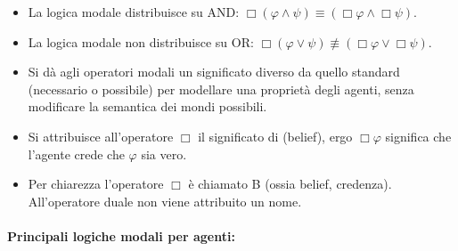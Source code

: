 \begin{itemize}
  \item La logica modale distribuisce su AND: $\Box (\varphi \wedge \psi) \equiv (\Box \varphi \wedge \Box \psi)$. 
  \item La logica modale non distribuisce su OR: $\Box (\varphi \vee \psi) \not\equiv (\Box \varphi \vee \Box \psi)$. 

\end{itemize}


\begin{itemize}
  \item Si dà agli operatori modali un significato diverso da quello standard (necessario o possibile) per modellare una proprietà degli agenti, senza modificare la semantica dei mondi possibili. 
  \item Si attribuisce all'operatore $\Box$ il significato di  (belief), ergo $\Box\varphi$ significa che l'agente crede che $\varphi$ sia vero. 
  \item Per chiarezza l'operatore $\Box$ è chiamato B (ossia belief, credenza). All'operatore duale non viene attribuito un nome.
\end{itemize}

\paragraph{Principali logiche modali per agenti:}

